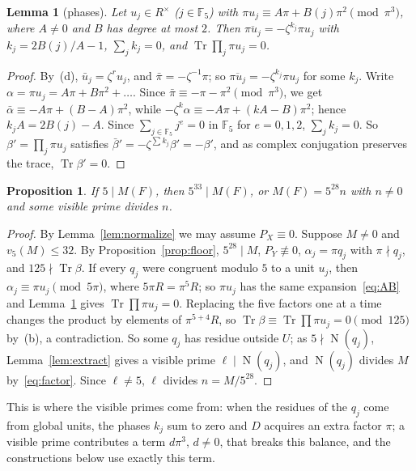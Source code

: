 \documentclass[11pt]{article}
\newtheorem{lemma}{Lemma}
\newtheorem{proposition}{Proposition}
\theoremstyle{definition}
\theoremstyle{remark}
\newcommand{\F}{\mathbb F_5}
\newcommand{\Tr}{\operatorname{Tr}}
\newcommand{\N}{\operatorname{N}}
\begin{document}
\begin{lemma}[phases]\label{lem:phase}
Let $u_j\in R^\times$ ($j\in\F$) with $\pi u_j\equiv A\pi+B(j)\pi^2\pmod{\pi^3}$,
where $A\ne0$ and $B$ has degree at most $2$. Then
$\overline{\pi u_j}=-\zeta^{k_j}\pi u_j$ with $k_j=2B(j)/A-1$, $\sum_jk_j=0$,
and $\Tr\prod_j\pi u_j=0$.
\end{lemma}

\begin{proof}
By~(d), $\bar u_j=\zeta^{r}u_j$, and $\bar\pi=-\zeta^{-1}\pi$; so
$\overline{\pi u_j}=-\zeta^{k_j}\pi u_j$ for some $k_j$. Write
$\alpha=\pi u_j=A\pi+B\pi^2+\dots$. Since
$\bar\pi\equiv-\pi-\pi^2\pmod{\pi^3}$, we get
$\bar\alpha\equiv-A\pi+(B-A)\pi^2$, while
$-\zeta^{k}\alpha\equiv-A\pi+(kA-B)\pi^2$; hence $k_jA=2B(j)-A$. Since
$\sum_{j\in\F}j^e=0$ in $\F$ for $e=0,1,2$, $\sum_jk_j=0$. So
$\beta'=\prod_j\pi u_j$ satisfies $\bar\beta'=-\zeta^{\sum k_j}\beta'=-\beta'$,
and as complex conjugation preserves the trace, $\Tr\beta'=0$.
\end{proof}

\begin{proposition}\label{prop:necessity}
If $5\mid M(F)$, then $5^{33}\mid M(F)$, or $M(F)=5^{28}n$ with $n\ne0$ and
some visible prime divides $n$.
\end{proposition}

\begin{proof}
By Lemma~\ref{lem:normalize} we may assume $P_X\equiv0$. Suppose $M\ne0$ and
$v_5(M)\le32$. By Proposition~\ref{prop:floor}, $5^{28}\mid M$,
$P_Y\not\equiv0$, $\alpha_j=\pi q_j$ with $\pi\nmid q_j$, and
$125\nmid\Tr\beta$. If every $q_j$ were congruent modulo $5$ to a unit $u_j$,
then $\alpha_j\equiv\pi u_j\pmod{5\pi}$, where $5\pi R=\pi^5R$; so $\pi u_j$
has the same expansion~\eqref{eq:AB} and Lemma~\ref{lem:phase} gives
$\Tr\prod\pi u_j=0$. Replacing the five factors one at a time changes the
product by elements of $\pi^{5+4}R$, so
$\Tr\beta\equiv\Tr\prod\pi u_j=0\pmod{125}$ by~(b), a contradiction. So
some $q_j$ has residue outside $U$; as $5\nmid\N(q_j)$,
Lemma~\ref{lem:extract} gives a visible prime $\ell\mid\N(q_j)$, and
$\N(q_j)$ divides $M$ by~\eqref{eq:factor}. Since $\ell\ne5$, $\ell$ divides
$n=M/5^{28}$.
\end{proof}

\noindent This is where the visible primes come from: when the residues of the
$q_j$ come from global units, the phases $k_j$ sum to zero and $D$ acquires an
extra factor $\pi$; a visible prime contributes a term $d\pi^3$, $d\ne0$, that
breaks this balance, and the constructions below use exactly this term.
\end{document}
